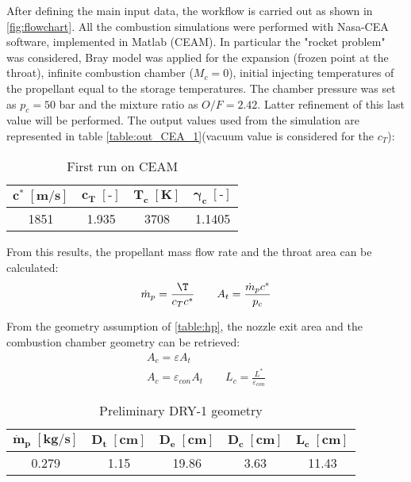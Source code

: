 After defining the main input data, the workflow is carried out as shown in \autoref{fig:flowchart}. All the combustion simulations were performed with Nasa-CEA software, implemented in Matlab (CEAM). In particular the "rocket problem" was considered, Bray model was applied for the expansion (frozen point at the throat), infinite combustion chamber ($M_c = 0$), initial injecting temperatures of the propellant equal to the storage temperatures. The chamber pressure was set as $p_c = 50$ bar and the mixture ratio as $O/F = 2.42$. Latter refinement of this last value will be performed. The output values used from the simulation are represented in table \autoref{table:out_CEA_1}(vacuum value is considered for the $c_T$):
\begin{table}[H]
    \renewcommand{\arraystretch}{1.2}
    \centering
    \begin{tabular}{|c|c|c|c|}
        \hline
        $\boldsymbol{c^* \; [\textbf{m/s}]}$ & $\boldsymbol{c_T \; [\textbf{-}]}$ & $\boldsymbol{T_c \; [\textbf{K}]}$ & $\boldsymbol{\gamma_c \; [\textbf{-}]}$ \\
        \hline
        \hline
        1851 & 1.935 & 3708 & 1.1405 \\
        \hline
    \end{tabular}
    \caption{First run on CEAM}
    \label{table:out_CEA_1}
\end{table}

From this results, the propellant mass flow rate and the throat area can be calculated:
\begin{equation}
    \dot{m}_p = \frac{\T}{c_T c^*} 
    \qquad 
    A_t = \frac{\dot{m}_p c^*}{p_c}
\end{equation}

From the geometry assumption of \autoref{table:hp}, the nozzle exit area and the combustion chamber geometry can be retrieved:
\begin{gather}
    A_e = \varepsilon A_t
    \\
    A_c = \varepsilon_{con} A_t \qquad L_c = \frac{L^*}{\varepsilon_{con}}
\end{gather}

\begin{table}[H]
    \renewcommand{\arraystretch}{1.2}
    \centering
    \begin{tabular}{|c|c|c|c|c|}
        \hline
        $\boldsymbol{\dot{m}_p \; [\textbf{kg/s}]}$ & $\boldsymbol{D_t \; [\textbf{cm}]}$ & $\boldsymbol{D_e \; [\textbf{cm}]}$  & $\boldsymbol{D_{c} \; [\textbf{cm}]}$ & $\boldsymbol{L_c \; [\textbf{cm}]}$ \\
        \hline
        \hline
        0.279 & 1.15 & 19.86 & 3.63 & 11.43 \\
        \hline
    \end{tabular}
    \caption{Preliminary DRY-1 geometry}
    \label{table:preliminary_dry}
\end{table}

